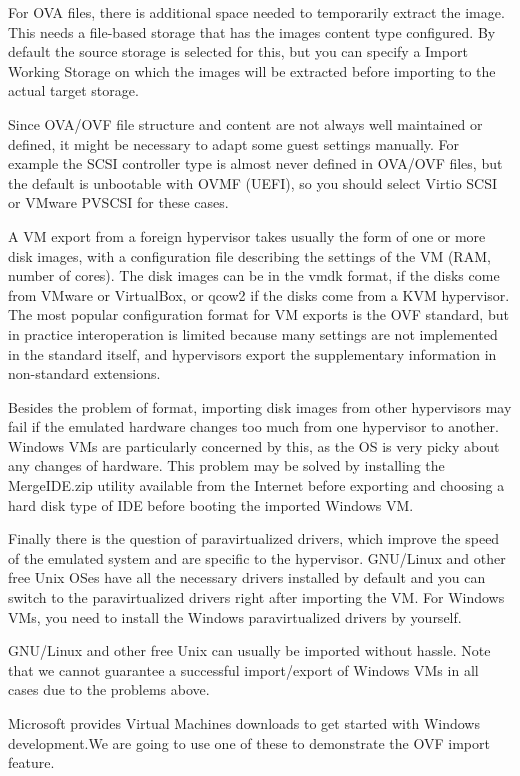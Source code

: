 For OVA files, there is additional space needed to temporarily extract the image. This needs a file-based storage that has the images content type configured. By default the source storage is selected for this, but you can specify a Import Working Storage on which the images will be extracted before importing to the actual target storage.

Since OVA/OVF file structure and content are not always well maintained or defined, it might be necessary to adapt some guest settings manually. For example the SCSI controller type is almost never defined in OVA/OVF files, but the default is unbootable with OVMF (UEFI), so you should select Virtio SCSI or VMware PVSCSI for these cases.

A VM export from a foreign hypervisor takes usually the form of one or more disk images, with a configuration file describing the settings of the VM (RAM, number of cores). The disk images can be in the vmdk format, if the disks come from VMware or VirtualBox, or qcow2 if the disks come from a KVM hypervisor. The most popular configuration format for VM exports is the OVF standard, but in practice interoperation is limited because many settings are not implemented in the standard itself, and hypervisors export the supplementary information in non-standard extensions.

Besides the problem of format, importing disk images from other hypervisors may fail if the emulated hardware changes too much from one hypervisor to another. Windows VMs are particularly concerned by this, as the OS is very picky about any changes of hardware. This problem may be solved by installing the MergeIDE.zip utility available from the Internet before exporting and choosing a hard disk type of IDE before booting the imported Windows VM.

Finally there is the question of paravirtualized drivers, which improve the speed of the emulated system and are specific to the hypervisor. GNU/Linux and other free Unix OSes have all the necessary drivers installed by default and you can switch to the paravirtualized drivers right after importing the VM. For Windows VMs, you need to install the Windows paravirtualized drivers by yourself.

GNU/Linux and other free Unix can usually be imported without hassle. Note that we cannot guarantee a successful import/export of Windows VMs in all cases due to the problems above.

Microsoft provides Virtual Machines downloads to get started with Windows development.We are going to use one of these to demonstrate the OVF import feature.

